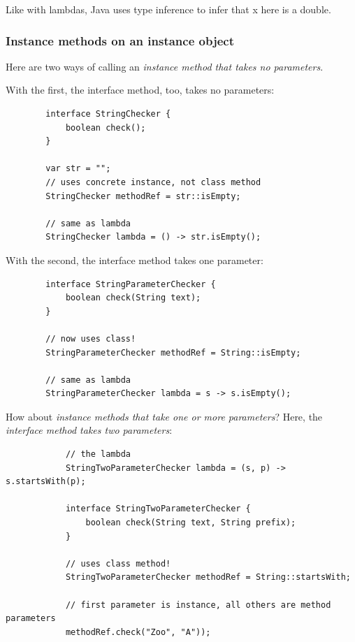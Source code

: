 \documentclass{scrartcl}
\begin{document}
    Like with lambdas, Java uses type inference to infer that x here is a double.

    \subsubsection{Instance methods on an instance object}

    Here are two ways of calling an \textit{instance method that takes no parameters}.

    With the first, the interface method, too, takes no parameters:


    \begin{lstlisting}
        interface StringChecker {
            boolean check();
        }

        var str = "";
        // uses concrete instance, not class method
        StringChecker methodRef = str::isEmpty;

        // same as lambda
        StringChecker lambda = () -> str.isEmpty();
    \end{lstlisting}

    With the second, the interface method takes one parameter:

    \begin{lstlisting}
        interface StringParameterChecker {
            boolean check(String text);
        }

        // now uses class!
        StringParameterChecker methodRef = String::isEmpty;

        // same as lambda
        StringParameterChecker lambda = s -> s.isEmpty();
    \end{lstlisting}

    How about \textit{instance methods that take one or more parameters}?
    Here, the \textit{interface method takes two parameters}:

        \begin{lstlisting}
            // the lambda
            StringTwoParameterChecker lambda = (s, p) -> s.startsWith(p);

            interface StringTwoParameterChecker {
                boolean check(String text, String prefix);
            }

            // uses class method!
            StringTwoParameterChecker methodRef = String::startsWith;

            // first parameter is instance, all others are method parameters
            methodRef.check("Zoo", "A"));
        \end{lstlisting}
\end{document}
